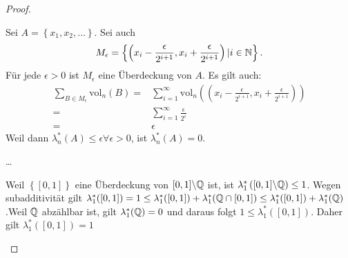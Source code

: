 \begin{proof}
	\begin{parts}
	\item	Sei $A=\left\{ x_1,x_2,\dots \right\} $. Sei auch
		\[
			M_\epsilon=\left\{\left( x_i-\frac{\epsilon}{2^{i+1}},x_i+\frac{\epsilon}{2^{i+1}}\right)|i\in\mathbb{N}  \right\} 
		.\] 
		F\"{u}r jede $\epsilon>0$ ist $M_\epsilon$ eine \"{U}berdeckung von $A$. Es gilt auch:
		\begin{align*}
			\sum_{B \in M_\epsilon} \text{vol}_n(B)=& \sum_{i=1}^\infty \text{vol}_n\left( \left( x_i-\frac{\epsilon}{2^{i+1}},x_i+\frac{\epsilon}{2^{i+1}} \right)  \right) \\
			=&\sum_{i=1}^{\infty} \frac{\epsilon}{2^i}\\
			=&\epsilon
		\end{align*}
		Weil dann $\lambda_n^*(A)\le \epsilon\forall \epsilon>0$, ist $\lambda_n^*(A)=0$.
	\item \ldots
	\item Weil $\left\{ [0,1] \right\} $ eine \"{U}berdeckung von $[0,1]\backslash \mathbb{Q}$ ist, ist $\lambda_1^*\left( [0,1]\backslash\mathbb{Q} \right) \le 1$. Wegen subadditivität gilt $\lambda_1^*([0,1])=1\le \lambda_1^*([0,1])+\lambda_1^*(\mathbb{Q}\cap [0,1])\le \lambda_1^*([0,1])+\lambda_1^*(\mathbb{Q})$.Weil $\mathbb{Q}$ abz\"{a}hlbar ist, gilt $\lambda_1^*(\mathbb{Q})=0$ und daraus folgt $1\le \lambda_1^*\left( [0,1] \right) $. Daher gilt $\lambda_1^*\left( [0,1] \right) =1$
	\end{parts}
\end{proof}
